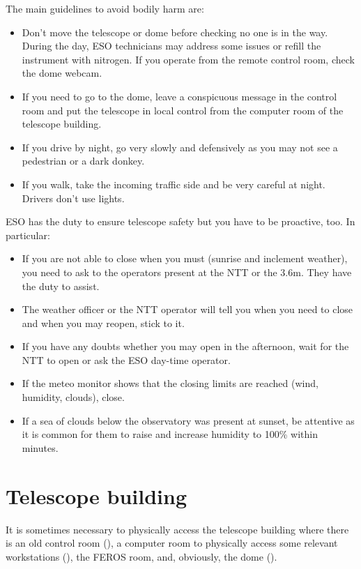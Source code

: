 \documentclass[11pt,fleqn,a4paper]{book}
\begin{document}
The main guidelines to avoid bodily harm are:
\begin{itemize}
\item Don't move the telescope or \gls{dome} before checking no one is in the way.  During the day, ESO technicians may address some issues or refill the instrument with nitrogen.  If you operate from the remote \gls{control room}, check the dome \gls{webcam}.
\item If you need to go to the \gls{dome}, leave a conspicuous message in the \gls{control room} and put the telescope in local control from the \gls{computer room} of the telescope building.
\item If you drive by night, go very slowly and defensively as you may not see a pedestrian or a dark donkey.  
\item If you walk, take the incoming traffic side and be very careful at night. Drivers don't use lights.
\end{itemize}

ESO has the duty to ensure telescope safety but you have to be proactive, too.  In particular:
\begin{itemize}
\item If you are not able to close when you must (sunrise and inclement weather), you need to ask to the operators present at the NTT or the 3.6m. They have the duty to assist.  
\item The weather officer or the NTT operator will tell you when you need to close and when you may reopen, stick to it.
\item If you have any doubts whether you may open in the afternoon, wait for the NTT to open or ask the ESO day-time operator.
\item If the meteo monitor shows that the closing limits are reached (wind, humidity, clouds), close.
\item If a sea of clouds below the observatory was present at sunset, be attentive as it is common for them to raise and increase humidity to 100\% within minutes.
\end{itemize}

\section{Telescope building}

It is sometimes necessary to physically access the telescope building where there is an old control room (), a \gls{computer room} to physically access some relevant workstations (), the FEROS room, and, obviously, the \gls{dome} ().  
\end{document}
